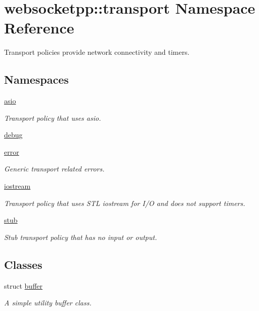 \hypertarget{namespacewebsocketpp_1_1transport}{}\section{websocketpp\+:\+:transport Namespace Reference}
\label{namespacewebsocketpp_1_1transport}


Transport policies provide network connectivity and timers.  


\subsection*{Namespaces}
\begin{DoxyCompactItemize}
\item 
 \hyperlink{namespacewebsocketpp_1_1transport_1_1asio}{asio}
\begin{DoxyCompactList}\small\item\em Transport policy that uses asio. \end{DoxyCompactList}\item 
 \hyperlink{namespacewebsocketpp_1_1transport_1_1debug}{debug}
\item 
 \hyperlink{namespacewebsocketpp_1_1transport_1_1error}{error}
\begin{DoxyCompactList}\small\item\em Generic transport related errors. \end{DoxyCompactList}\item 
 \hyperlink{namespacewebsocketpp_1_1transport_1_1iostream}{iostream}
\begin{DoxyCompactList}\small\item\em Transport policy that uses S\+T\+L iostream for I/\+O and does not support timers. \end{DoxyCompactList}\item 
 \hyperlink{namespacewebsocketpp_1_1transport_1_1stub}{stub}
\begin{DoxyCompactList}\small\item\em Stub transport policy that has no input or output. \end{DoxyCompactList}\end{DoxyCompactItemize}
\subsection*{Classes}
\begin{DoxyCompactItemize}
\item 
struct \hyperlink{structwebsocketpp_1_1transport_1_1buffer}{buffer}
\begin{DoxyCompactList}\small\item\em A simple utility buffer class. \end{DoxyCompactList}\end{DoxyCompactItemize}
